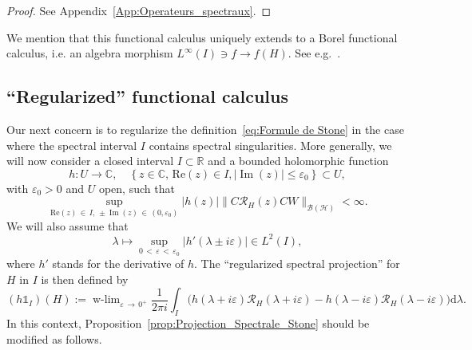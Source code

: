 \documentclass[AHL,Unicode,longabstracts,published]{cedram}
\newcommand{\Hi}{\mathcal{H}}
\newcommand{\bbC}{\mathbb{C}}
\newcommand{\R}{\mathbb{R}}
\newcommand{\rmd}{\mathrm{d}}
\newcommand{\Res}{\mathcal{R}}
\newcommand{\clB}{\mathcal{B}}
\DeclareMathOperator{\wlim}{w-lim}
\DeclareMathOperator{\im}{Im}
\newcommand*\bbC{\mathbb{C}}
\newcommand{\Hi}{\mathcal{H}}
\newcommand{\R}{\mathbb{R}}
\DeclareMathOperator{\im}{Im}
\begin{document}
\begin{proof}
See Appendix~\ref{App:Operateurs_spectraux}.
\end{proof}

We mention that this functional calculus uniquely extends to a Borel functional calculus, i.e. an algebra morphism $L^\infty(I)\ni f\to f(H)$. See e.g.~\cite[Theorem~2.4]{GeGeHa13_01}.


\subsection{``Regularized'' functional calculus}\label{subsec:regul_funct_calc}


Our next concern is to regularize the definition~\eqref{eq:Formule de Stone} in the case where the spectral interval $I$ contains spectral singularities. More generally, we will now consider a closed interval $I\subset\R$ and a bounded holomorphic function
\begin{equation*}
h:U\to\bbC, \quad \left\{z\in\bbC,\, \mathrm{Re}(z)\in I, |\im(z)|\le\varepsilon_0\right\}\subset U,
\end{equation*}
with $\varepsilon_0>0$ and $U$ open, such that
\begin{equation}\label{eq:limit_uniform_I_sing}
\sup_{\mathrm{Re}(z)\,\in\,I,\,\pm\im(z)\,\in\,(0,\varepsilon_0)} |h(z)| \big\|C\Res_H(z)CW\big\|_{\clB(\Hi)}<\infty.
\end{equation}
We will also assume that
\begin{equation}\label{eq:h_assumpt}
\lambda\mapsto\sup_{0\,<\,\varepsilon\,<\,\varepsilon_0}\left|h'(\lambda\pm i\varepsilon)\right| \in L^2(I),
\end{equation}
where $h'$ stands for the derivative of $h$. The ``regularized spectral projection'' for $H$ in $I$ is then defined by
\begin{equation}\label{eq:Formule de Stone_regul}
(h \mathds{1}_I)(H):=\wlim_{\varepsilon\,\rightarrow\,0^+}\frac{1}{2\pi i}\int_I\big(h(\lambda+i\varepsilon)\Res_H(\lambda+i\varepsilon)-h(\lambda-i\varepsilon)\Res_H(\lambda-i\varepsilon)\big)\rmd \lambda.
\end{equation}
In this context, Proposition~\ref{prop:Projection_Spectrale_Stone} should be modified as follows.
\end{document}
